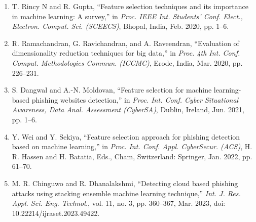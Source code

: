 \documentclass[12pt,a4paper]{report}
\begin{document}
\begin{enumerate}
\item T. Rincy N and R. Gupta,
``Feature selection techniques and its importance in machine learning: A survey,''
in \textit{Proc. IEEE Int. Students' Conf. Elect., Electron. Comput. Sci. (SCEECS)},
Bhopal, India, Feb. 2020, pp. 1--6.

\item R. Ramachandran, G. Ravichandran, and A. Raveendran,
``Evaluation of dimensionality reduction techniques for big data,''
in \textit{Proc. 4th Int. Conf. Comput. Methodologies Commun. (ICCMC)},
Erode, India, Mar. 2020, pp. 226--231.

\item S. Dangwal and A.-N. Moldovan,
``Feature selection for machine learning-based phishing websites detection,''
in \textit{Proc. Int. Conf. Cyber Situational Awareness, Data Anal. Assessment (CyberSA)},
Dublin, Ireland, Jun. 2021, pp. 1--6.

\item Y. Wei and Y. Sekiya,
``Feature selection approach for phishing detection based on machine learning,''
in \textit{Proc. Int. Conf. Appl. CyberSecur. (ACS)},
H. R. Hassen and H. Batatia, Eds., Cham, Switzerland: Springer, Jan. 2022,
pp. 61--70.

\item M. R. Chinguwo and R. Dhanalakshmi,
``Detecting cloud based phishing attacks using stacking ensemble machine learning technique,''
\textit{Int. J. Res. Appl. Sci. Eng. Technol.}, vol. 11, no. 3,
pp. 360--367, Mar. 2023, doi: 10.22214/ijraset.2023.49422.

\end{enumerate}%
\end{document}
